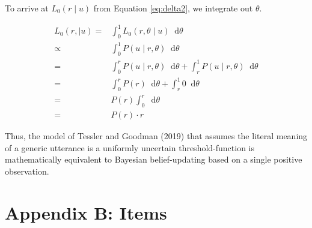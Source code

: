 \documentclass[floatsintext,doc]{apa6}
\begin{document}
\noindent To arrive at \(L_0(r \mid u)\) from Equation \ref{eq:delta2}, we integrate out \(\theta\).

\begin{align}
L_0(r, \mid u) =& \int_{0}^{1} L_0(r, \theta \mid u) \mathop{}\!\mathrm{d}\theta \nonumber \\
\propto& \int_{0}^{1} P(u \mid r, \theta)  \mathop{}\!\mathrm{d}\theta \nonumber \\
=& \int_{0}^{r} P(u \mid r, \theta) \mathop{}\!\mathrm{d}\theta + \int_{r}^{1}P(u \mid r, \theta) \mathop{}\!\mathrm{d}\theta \nonumber \\
=& \int_{0}^{r} P(r) \mathop{}\!\mathrm{d}\theta + \int_{r}^{1} 0 \mathop{}\!\mathrm{d}\theta \nonumber  \\ 
   = &  P(r) \int_{0}^{r} \mathop{}\!\mathrm{d}\theta \nonumber \\
     = &   P(r) \cdot r \label{eq:L0d}
\end{align}

Thus, the model of Tessler and Goodman (2019) that assumes the literal meaning of a generic utterance is a uniformly uncertain threshold-function is mathematically equivalent to Bayesian belief-updating based on a single positive observation. 

\newpage
\hypertarget{appendix-items}{%
\section{Appendix B: Items}\label{appendix-items}}

\setcounter{table}{0} \renewcommand{\thetable}{B.\arabic{table}}
\end{document}
